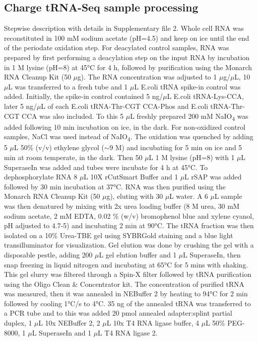 \documentclass[9pt,lineno]{elife}
\begin{document}
\subsection{Charge tRNA-Seq sample processing}
Stepwise description with details in Supplementary file 2.
Whole cell RNA was reconstituted in 100 mM sodium acetate (pH=4.5) and keep on ice until the end of the periodate oxidation step.
For deacylated control samples, RNA was prepared by first performing a deacylation step on the input RNA by incubation in 1 M lysine (pH=8) at 45°C for 4 h, followed by purification using the Monarch RNA Cleanup Kit (50 $\mu$g).
The RNA concentration was adjusted to 1 $\mu$g/$\mu$L, 10 $\mu$L was transferred to a fresh tube and 1 $\mu$L E.coli tRNA spike-in control was added.
Initially, the spike-in control contained 5 ng/$\mu$L E.coli tRNA-Lys-CCA, later 5 ng/$\mu$L of each E.coli tRNA-Thr-CGT CCA-Phos and E.coli tRNA-Thr-CGT CCA was also included.
To this 5 $\mu$L freshly prepared 200 mM NaIO\textsubscript{4} was added following 10 min incubation on ice, in the dark.
For non-oxidized control samples, NaCl was used instead of NaIO\textsubscript{4}.
The oxidation was quenched by adding 5 $\mu$L 50\% (v/v) ethylene glycol ($\sim$9 M) and incubating for 5 min on ice and 5 min at room temperate, in the dark.
Then 50 $\mu$L 1 M lysine (pH=8) with 1 $\mu$L SuperaseIn was added and tubes were incubate for 4 h at 45°C.
To dephosphorylate RNA 8 $\mu$L 10X rCutSmart Buffer and 1 $\mu$L rSAP was added followed by 30 min incubation at 37°C.
RNA was then purified using the Monarch RNA Cleanup Kit (50 $\mu$g), eluting with 30 $\mu$L water.
A 6 $\mu$L sample was then denatured by mixing with 2x urea loading buffer (8 M urea, 30 mM sodium acetate, 2 mM EDTA, 0.02 \% (w/v) bromophenol blue and xylene cyanol, pH adjusted to 4.7-5) and incubating 2 min at 90°C.
The tRNA fraction was then isolated on a 10\% Urea-TBE gel using SYBRGold staining and a blue light transilluminator for visualization.
Gel elution was done by crushing the gel with a disposable pestle, adding 200 $\mu$L gel elution buffer and 1 $\mu$L SuperaseIn, then snap freezing in liquid nitrogen and incubating at 65°C for 5 mins with shaking.
This gel slurry was filtered through a Spin-X filter followed by tRNA purification using the Oligo Clean \& Concentrator kit.
The concentration of purified tRNA was measured, then it was annealed in  NEBuffer 2 by heating to 94°C for 2 min followed by cooling 1°C/s to 4°C.
35 ng of the annealed tRNA was transferred to a PCR tube and to this was added 20 pmol annealed adapter:splint partial duplex, 1 $\mu$L 10x NEBuffer 2, 2 $\mu$L 10x T4 RNA ligase buffer, 4 $\mu$L 50\% PEG-8000, 1 $\mu$L SuperaseIn and 1 $\mu$L T4 RNA ligase 2.
\end{document}
